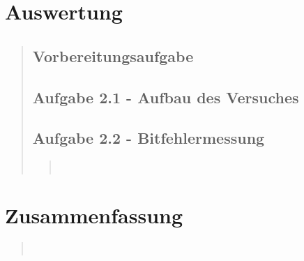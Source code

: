 \section{Auswertung}
\begin{quote}
    
    \subsection{Vorbereitungsaufgabe}
    \begin{quote}
        
    \end{quote}  %
    
    \subsection{Aufgabe 2.1 - Aufbau des Versuches}
    \begin{quote}
        
    \end{quote}  %
    
    \subsection{Aufgabe 2.2 - Bitfehlermessung}
    \begin{quote}
         \\
    \end{quote}  %
         	
\end{quote}%

    
\section{Zusammenfassung}
\begin{quote}

     \\
\end{quote}%
         



